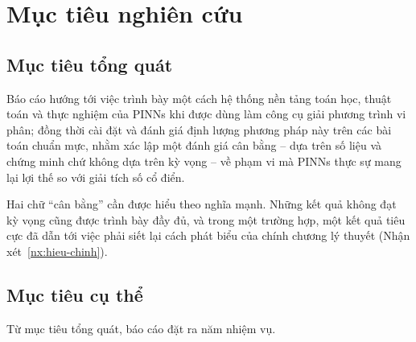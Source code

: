 \section{Mục tiêu nghiên cứu}
\label{sec:muc-tieu}
 
\subsection{Mục tiêu tổng quát}
 
Báo cáo hướng tới việc trình bày một cách hệ thống nền tảng toán học, thuật toán
và thực nghiệm của PINNs khi được dùng làm công cụ giải phương trình vi phân;
đồng thời cài đặt và đánh giá định lượng phương pháp này trên các bài toán chuẩn
mực, nhằm xác lập một đánh giá cân bằng -- dựa trên số liệu và chứng minh chứ
không dựa trên kỳ vọng -- về phạm vi mà PINNs thực sự mang lại lợi thế so với giải
tích số cổ điển.
 
Hai chữ ``cân bằng'' cần được hiểu theo nghĩa mạnh. Những kết quả không đạt kỳ
vọng cũng được trình bày đầy đủ, và trong một trường hợp, một kết quả tiêu cực
đã dẫn tới việc phải siết lại cách phát biểu của chính chương lý thuyết
(Nhận xét~\ref{nx:hieu-chinh}).
 
\subsection{Mục tiêu cụ thể}
\label{subsec:mt-cu-the}
 
Từ mục tiêu tổng quát, báo cáo đặt ra năm nhiệm vụ.
 
